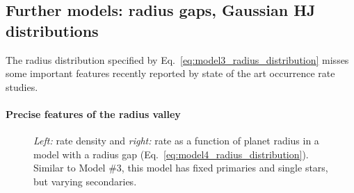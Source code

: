 \documentclass[12pt,modern]{aastex61}
\begin{document}

\subsection{Further models: radius gaps, Gaussian HJ distributions}

The radius distribution specified by Eq.~\ref{eq:model3_radius_distribution} 
misses some important features recently reported by state of the art 
occurrence rate studies.

\paragraph{Precise features of the radius valley}

\begin{figure}[!tb]
    \centering
    \caption{
        {\it Left:} rate density and {\it right:} rate as a 
        function of planet radius in a model with a radius gap 
        (Eq.~\ref{eq:model4_radius_distribution}).
        Similar to Model \#3, this model has fixed primaries and single stars, 
        but varying secondaries.
    }
    \label{fig:model_4}
\end{figure}
\end{document}
